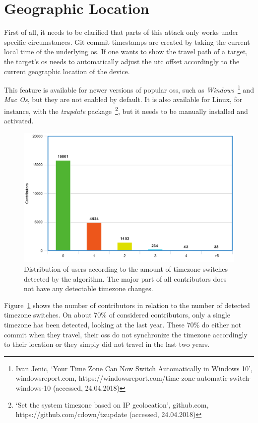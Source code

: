 \section{Geographic Location}

First of all, it needs to be clarified that parts of this attack only works under specific circumstances.
Git commit timestamps are created by taking the current local time of the underlying \ac{os}.
If one wants to show the travel path of a target, the target's \ac{os} needs to automatically adjust the \ac{utc} offset accordingly to the current geographic location of the device.

This feature is available for newer versions of popular \acp{os}, such as \emph{Windows}~\footnote{Ivan Jenic, `Your Time Zone Can Now Switch Automatically in Windows 10', windowsreport.com, https://windowsreport.com/time-zone-automatic-switch-windows-10 (accessed, 24.04.2018)}
and \emph{Mac Os}, but they are not enabled by default.
It is also available for Linux, for instance, with the \emph{tzupdate} package~\footnote{`Set the system timezone based on IP geolocation', github.com, https://github.com/cdown/tzupdate (accessed, 24.04.2018)}, but it needs to be manually installed and activated.

\begin{figure}[H]
    \includegraphics[scale=0.38]{./graphs/analysis/timezone-switch-distribution}
    \centering
    \caption{Distribution of users according to the amount of timezone switches detected by the algorithm.
    The major part of all contributors does not have any detectable timezone changes.}\label{fig:timezone-switch-distribution}
\end{figure}

Figure~\ref{fig:timezone-switch-distribution} shows the number of contributors in relation to the number of detected timezone switches.
On about 70\% of considered contributors, only a single timezone has been detected, looking at the last year.
These 70\% do either not commit when they travel, their \acp{os} do not synchronize the timezone accordingly to their location or they simply did not travel in the last two years.

